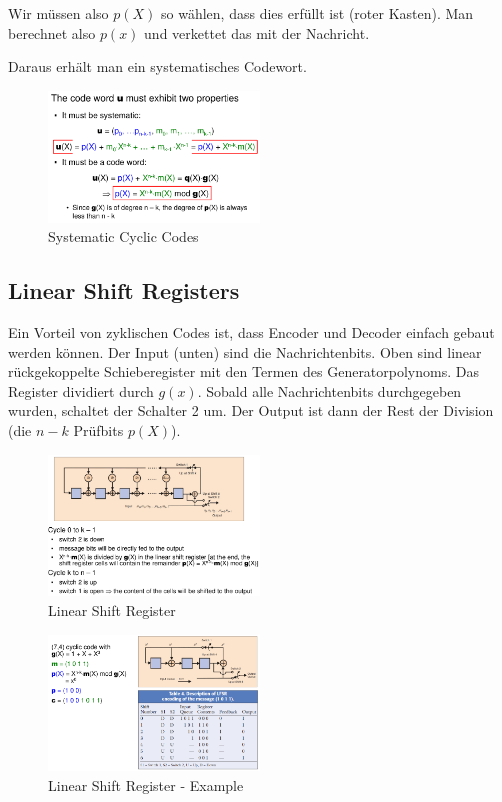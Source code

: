 Wir müssen also $p(X)$ so wählen, dass dies erfüllt ist (roter Kasten).
Man berechnet also $p(x)$ und verkettet das mit der Nachricht.

Daraus erhält man ein systematisches Codewort.

\begin{figure}[H]
\centering
\includegraphics[width=0.5\textwidth]{figures/systematic_cyclic_codes.png}
\caption{Systematic Cyclic Codes}
\end{figure}

\subsection{Linear Shift Registers}
Ein Vorteil von zyklischen Codes ist, dass Encoder und Decoder einfach gebaut werden können.
Der Input (unten) sind die Nachrichtenbits. Oben sind linear rückgekoppelte Schieberegister mit den Termen des Generatorpolynoms. Das Register dividiert durch $g(x)$. Sobald alle Nachrichtenbits durchgegeben wurden, schaltet der Schalter 2 um. Der Output ist dann der Rest der Division (die $n-k$ Prüfbits $p(X)$).

\begin{figure}[H]
\centering
\includegraphics[width=0.5\textwidth]{figures/linearShiftRegister.png}
\caption{Linear Shift Register}
\end{figure}

\begin{figure}[H]
\centering
\includegraphics[width=0.5\textwidth]{figures/linearShiftRegisterExample.png}
\caption{Linear Shift Register - Example}
\end{figure}

